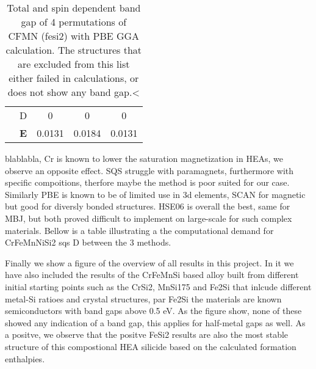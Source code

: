 \begin{table}[H]
\begin{tabular}{@{}ccccc@{}}
\multicolumn{1}{c|}{}                                & D & 0                     & 0                       & 0          \\
\multicolumn{1}{c|}{}                                & \textbf{E} & 0.0131                & 0.0184                       & 0.0131                   \\ \bottomrule
\end{tabular}
\caption{Total and spin dependent band gap of 4 permutations of CFMN (fesi2) with PBE GGA calculation. The structures that are excluded from this list either failed in calculations, or does not show any band gap.<}
\end{table}


blablabla, Cr is known to lower the saturation magnetization in HEAs, we observe an opposite effect. SQS struggle with paramagnets, furthermore with specific compoitions, therfore maybe the method is poor suited for our case. Similarly PBE is known to be of limited use in 3d elements, SCAN for magnetic but good for diversly bonded structures. HSE06 is overall the best, same for MBJ, but both proved difficult to implement on large-scale for such complex materials. Bellow is a table illustrating a the computational demand for CrFeMnNiSi2 sqs D between the 3 methods. 

Finally we show a figure of the overview of all results in this project. In it we have also included the results of the CrFeMnSi based alloy built from different initial starting points such as the CrSi2, MnSi175 and Fe2Si that inlcude different metal-Si ratioes and crystal structures, par Fe2Si the materials are known semiconductors with band gaps above 0.5 eV. As the figure show, none of these showed any indication of a band gap, this applies for half-metal gaps as well. As a positve, we observe that the positve FeSi2 results are also the most stable structure of this compostional HEA silicide based on the calculated formation enthalpies.  


